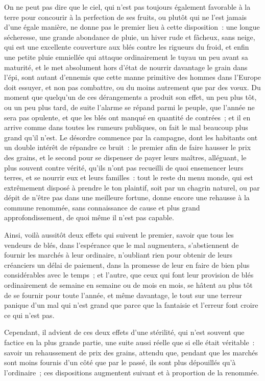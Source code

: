 \documentclass[french,twoside]{book} %
\begin{document}
On ne peut pas dire que le ciel, qui n’est pas toujours également favorable à la terre pour concourir à la perfection de ses fruits, ou plutôt qui ne l’est jamais d’une égale manière, ne donne pas le premier lieu à cette disposition : une longue sécheresse, une grande abondance de pluie, un hiver rude et fâcheux, sans neige, qui est une excellente couverture aux blés contre les rigueurs du froid, et enfin une petite pluie emniellée qui attaque ordinairement le tuyau un peu avant sa maturité, et le met absolument hors d’état de nourrir davantage le grain dans l’épi, sont autant d’ennemis que cette manne primitive des hommes dans l’Europe doit essuyer, et non pas combattre, ou du moins autrement que par des vœux. Du moment que quelqu’un de ces dérangements a produit son effet, un peu plus tôt, ou un peu plus tard, de suite l’alarme se répand parmi le peuple, que l’année ne sera pas opulente, et que les blés ont manqué en quantité de contrées ; et il en arrive comme dans toutes les rumeurs publiques, on fait le mal beaucoup plus grand qu’il n’est. Le désordre commence par la campagne, dont les habitants ont un double intérêt de répandre ce bruit : le premier afin de faire hausser le prix des grains, et le second pour se dispenser de payer leurs maîtres, alléguant, le plus souvent contre vérité, qu’ils n’ont pas recueilli de quoi ensemencer leurs terres, et se nourrir eux et leurs familles : tout le reste du menu monde, qui est extrêmement disposé à prendre le ton plaintif, soit par un chagrin naturel, ou par dépit de n’être pas dans une meilleure fortune, donne encore une rehausse à la commune renommée, sans connaissance de cause et plus grand approfondissement, de quoi même il n’est pas capable.\par
Ainsi, voilà aussitôt deux effets qui suivent le premier, savoir que tous les vendeurs de blés, dans l’espérance que le mal augmentera, s’abstiennent de fournir les marchés à leur ordinaire, n’oubliant rien pour obtenir de leurs créanciers un délai de paiement, dans la promesse de leur en faire de bien plus considérables avec le temps ; et l’autre, que ceux qui font leur provision de blés ordinairement de semaine en semaine ou de mois en mois, se hâtent au plus tôt de se fournir pour toute l’année, et même davantage, le tout sur une terreur panique d’un mal qui n’est grand que parce que la fantaisie et l’erreur font croire ce qui n’est pas.\par
Cependant, il advient de ces deux effets d’une stérilité, qui n’est souvent que factice en la plus grande partie, une suite aussi réelle que si elle était véritable : savoir un rehaussement de prix des grains, attendu que, pendant que les marchés sont moins fournis d’un côté que par le passé, ils sont plus dépouillés qu’à l’ordinaire ; ces dispositions augmentent suivant et à proportion de la renommée.\par
\end{document}
